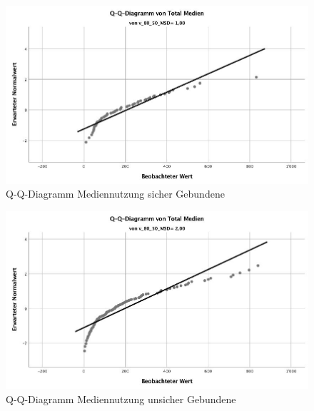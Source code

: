 \begin{figure}[h]
  \centering
     \includegraphics[scale=0.4]{content/Grafik/QQDiagramm_TotalMedien_SicherGebunden.jpg}
  \caption{Q-Q-Diagramm Mediennutzung sicher Gebundene}
  \label{fig:AppQQDiagrammSicherGebunden}
\end{figure}
\begin{figure}[h]
  \centering
     \includegraphics[scale=0.4]{content/Grafik/QQDiagramm_TotalMedien_UnsicherGebunden.jpg}
  \caption{Q-Q-Diagramm Mediennutzung unsicher Gebundene}
  \label{fig:AppQQDiagrammUnsicherGebunden}
\end{figure}